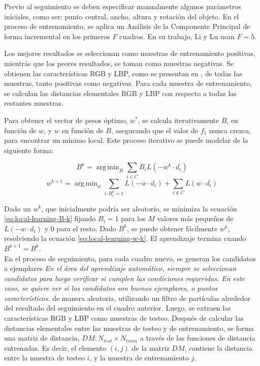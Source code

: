 \documentclass[a4paper,10pt]{article}
\DeclareMathOperator*{\argmin}{arg\,min}
\begin{document}
Previo al seguimiento se deben especificar manualmente algunos parámetros iniciales, 
como ser: punto central, ancho, altura y rotación del objeto. En el proceso de 
entrenamiento, se aplica un Análisis de la Componente Principal 
de forma incremental en los primeros $F$ cuadros. En su trabajo, Li y Lu usan
$F = 5$\cite{local-learning}.

Los mejores resultados se seleccionan como muestras de entrenamiento positivas, mientrás que
los peores resultados, se toman como muestras negativas. Se obtienen las características 
RGB y LBP, como se presentan en \cite{tracking-bag-of-features}, de todas las muestras, 
tanto positivas como negativas. Para cada muestra de entrenamiento, se calculan las 
distancias elementales RGB y LBP con respecto a todas las restantes muestras.

Para obtener el vector de pesos óptimo, $w^{*}$, se calcula iterativamente $B$, 
en función de $w$, y $w$ en función de $B$, asegurando que el valor de $f_{1}$ nunca 
crezca, para encontrar un mínimo local. Este proceso iterativo se puede modelar de la 
siguiente forma:

\begin{equation}
   \label{eq:local-learning-B-k}
   B^{k} = \argmin_{B} \sum_{i \in C} B_{i}L(-w^{k} \cdot d_{i})
\end{equation}
\begin{equation}
    \label{eq:local-learning-w-k}
    w^{k+1} = \argmin_{w} \sum_{i:B_{i}^{k}=1} L(-w \cdot d_{i}) + \sum_{i\notin C}L(w \cdot d_{i})
\end{equation}

Dado un $w^{k}$, que inicialmente podría ser aleatorio, se minimiza la ecuación 
\ref{eq:local-learning-B-k} fijando $B_{i} = 1$ para los $M$ valores más
pequeños de $L(-w \cdot d_{i})$ y $0$ para el resto. Dado $B^{k}$, se puede
obtener fácilmente $w^{k}$, resolviendo la ecuación \ref{eq:local-learning-w-k}. 
El aprendizaje termina cuando $B^{k+1}=B^{k}$.\\

En el proceso de seguimiento, para cada cuadro nuevo, se generan los
candidatos a ejemplares \textit{En el área del aprendizaje automático, siempre se seleccionan candidatos
para luego verificar si cumplen las condiciones requeridas. En este caso, se quiere ver si los candidatos son 
buenos ejemplares, o puntos característicos.}
 de manera aleatoria, utilizando un filtro de partículas 
alrededor del resultado del 
seguimiento en el cuadro anterior. Luego, se extraen las características
RGB y LBP como muestras de testeo. Después de calcular las distancias
elementales entre las muestras de testeo y de entrenamiento, se 
forma una matriz de distancia, $DM: N_{test} \times N_{train}$ a través
de las funciones de distancia entrenadas. Es decir, el elemento $(i,j)$ de la matriz $DM$, contiene la distancia
entre la muestra de testeo $i$, y la muestra de entrenamiento $j$.
\end{document}

